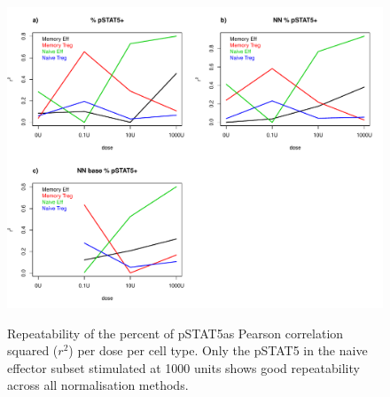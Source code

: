 \begin{figure}
\centering
\begin{minipage}{.8\textwidth}
\includegraphics[width=\linewidth]{figures/repeatability-PSTAT5-pos}
\end{minipage}
{
  Repeatability of the percent of pSTAT5\positive as Pearson correlation squared ($r^2$) per dose per cell type.
}
{
  Only the pSTAT5 in the naive effector subset stimulated at 1000 units shows good repeatability across all normalisation methods.
}
\end{figure}

%
%

